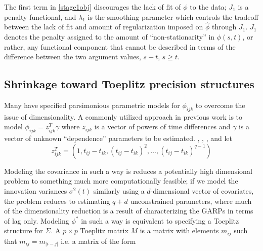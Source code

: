 \documentclass[12pt]{article}
\begin{document}
The first term in \eqref{stage1obj} discourages the lack of fit of $\phi$ to the data; $J_1$ is a penalty functional, and $\lambda_1$ is the smoothing parameter which controls the tradeoff between the lack of fit and amount of regularization imposed on $\hat{\phi}$ through $J_1$.  $J_1$ denotes the penalty assigned to the amount of ``non-stationarity'' in $\phi\left(s,t\right)$, or rather, any functional component that cannot be described in terms of the difference between the two argument values, $s-t$, $s \ge t$. %

\subsection{Shrinkage toward Toeplitz precision  structures}

Many have specified parsimonious parametric models for $\phi_{ijk}$ to overcome the issue of dimensionality. A commonly utilized approach in previous work is to model $\phi_{ijk} = z_{ijk}^T \gamma$ where $z_{ijk}$ is a vector of powers of time differences and $\gamma$ is a vector of unknown ``dependence'' parameters to be estimated. \citet{chen2011efficient}, \citet{lin2009robust}, \citet{pan2003modelling},  and \citet{pourahmadi1999joint} let 
\begin{equation}
z_{ijk}^T = \left(1, t_{ij} - t_{ik},\left( t_{ij} - t_{ik} \right)^2, \dots, \left(t_{ij} - t_{ik}\right)^{q-1} \right) \label{covmodel}
\end{equation}


Modeling the covariance in such a way is reduces a potentially high dimensional problem to something much more computationally feasible; if we model the innovation variances $\sigma^2\left(t\right)$ similarly using a $d$-dimensional vector of covariates, the problem reduces to estimating $q+d$ unconstrained parameters, where much of the dimensionality reduction is a result of characterizing the GARPs in terms of lag only. Modeling $\phi^*$ in such a way is equivalent to specifying a Toeplitz structure for $\Sigma$. A $p \times p$ Toeplitz matrix $M$ is a matrix with elements $m_{ij}$ such that $m_{ij} = m_{\vert i-j \vert}$ i.e. a matrix of the form
\end{document}
